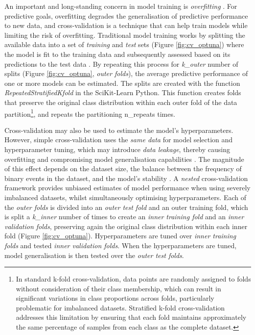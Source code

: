 An important and long-standing concern in model training is \textit{overfitting} \citep{Ying_2019}. For predictive goals, overfitting degrades the generalisation of predictive performance to new data, and cross-validation is a technique that can help train models while limiting the risk of overfitting. Traditional  model training works by splitting the available data into a set of \textcolor{colourTraining}{\textit{training}} and \textcolor{colourTest}{\textit{test}} sets (Figure \ref{fig:cv_optuna}) where the model is fit to the training data and subsequently assessed based on its predictions to the test data \citep{Hastie_2009}. By repeating this process for \textit{k\_outer} number of splits (Figure \ref{fig:cv_optuna}, \textcolor{colourOuterFolds}{\textit{outer folds}}), the average predictive performance of one or more models can be estimated. The splits are created with the function \textit{RepeatedStratifiedKfold} in the SciKit-Learn Python. This function creates folds that preserve the original class distribution within each outer fold of the data partition\footnote{In standard k-fold cross-validation, data points are randomly assigned to folds without consideration of their class membership, which can result in significant variations in class proportions across folds, particularly problematic for imbalanced datasets. Stratified k-fold cross-validation addresses this limitation by ensuring that each fold maintains approximately the same percentage of samples from each class as the complete dataset.}, and repeats the partitioning n_repeats times. 

Cross-validation  may also be used to estimate the model's hyperparameters. However, simple cross-validation uses the \textit{same data} for model selection and hyperparameter tuning, which may introduce \textit{data leakage}, thereby causing overfitting and compromising model generalisation capabilities \citep{Sasse_2025}. The magnitude of this effect depends on the dataset size, the balance between the frequency of binary events in the dataset, and the model's stability \citep{Sasse_2025}. A \textit{nested} cross-validation framework provides unbiased estimates of model performance when using severely imbalanced datasets, whilst simultaneously optimising hyperparameters. Each of the \textcolor{colourOuterFolds}{\textit{outer folds}} is divided into an \textcolor{colourOuterTest}{\textit{outer test fold}} and an outer training fold, which is split a \textit{k\_inner} number of times to create an \textcolor{colourInnerTraining}{\textit{inner training fold}} and an \textcolor{colourInnerValidation}{\textit{inner validation folds}}, preserving again the original class distribution within each inner fold (Figure \ref{fig:cv_optuna}). Hyperparameters are tuned over \textcolor{colourInnerTraining}{\textit{inner training folds}} and tested \textcolor{colourInnerValidation}{\textit{inner validation folds}}. When the hyperparameters are tuned, model generalisation is then tested over the \textcolor{colourOuterTest}{\textit{outer test folds}}.

